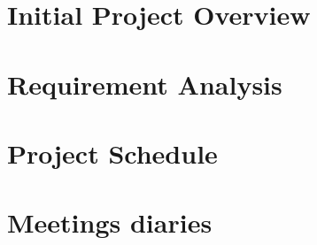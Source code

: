 \documentclass[12pt,a4paper]{report}
\begin{document}
\newpage
\begin{appendices}
\chapter{Initial Project Overview}
\label{appendix:IPO}


\chapter{Requirement Analysis} 
\label{appendix:requirementAnalysis}


\chapter{Project Schedule}
\label{appendix:projectSchedule}


\chapter{Meetings diaries}
\label{appendix:diaries}





\end{appendices}
\end{document}
